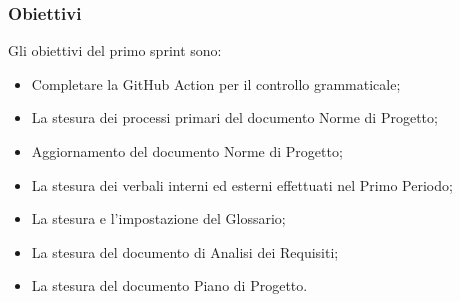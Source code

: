\subsubsection{Obiettivi}

Gli obiettivi del primo sprint sono:
\begin{itemize}
    \item Completare la GitHub Action per il controllo grammaticale;
    \item La stesura dei processi primari del documento Norme di Progetto;
    \item Aggiornamento del documento Norme di Progetto;
    \item La stesura dei verbali interni ed esterni effettuati nel Primo Periodo;
    \item La stesura e l'impostazione del Glossario;
    \item La stesura del documento di Analisi dei Requisiti;
    \item La stesura del documento Piano di Progetto.
\end{itemize}